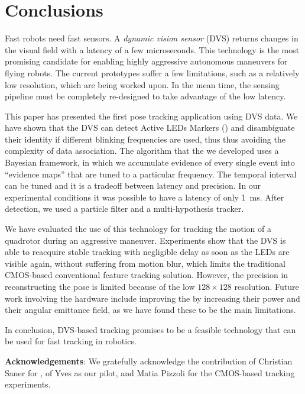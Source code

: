 
\section{Conclusions\label{sec:conclusion}}

Fast robots need fast sensors. A \emph{dynamic vision sensor} (DVS)
returns changes in the visual field with a latency of a few microseconds.
This technology is the most promising candidate for enabling highly
aggressive autonomous maneuvers for flying robots. The current prototypes
suffer a few limitations, such as a relatively low resolution, which
are being worked upon. In the mean time, the sensing pipeline must
be completely re-designed to take advantage of the low latency.

This paper has presented the first pose tracking application using
DVS data. We have shown that the DVS can detect Active LEDs Markers
(\ALMs) and disambiguate their identity if different blinking frequencies
are used, thus thus avoiding the complexity of data association. The
algorithm that the we developed uses a Bayesian framework, in which
we accumulate evidence of every single event into ``evidence maps''
that are tuned to a particular frequency. The temporal interval can
be tuned and it is a tradeoff between latency and precision. In our
experimental conditions it was possible to have a latency of only
1~ms. After detection, we used a particle filter and a multi-hypothesis
tracker. 

We have evaluated the use of this technology for tracking the motion
of a quadrotor during an aggressive maneuver. Experiments show that
the DVS is able to reacquire stable tracking with negligible delay
as soon as the LEDs are visible again, without suffering from motion
blur, which limits the traditional CMOS-based conventional feature
tracking solution. However, the precision in reconstructing the pose
is limited because of the low $128\times128$ resolution. Future work
involving the hardware include improving the \ALMs by increasing
their power and their angular emittance field, as we have found these
to be the main limitations.

In conclusion, DVS-based \ALM tracking promises to be a feasible
technology that can be used for fast tracking in robotics.







\textbf{Acknowledgements}: We gratefully acknowledge the contribution
of Christian Saner for \xxx, of Yves \xxx as our pilot, and Matia
Pizzoli for the CMOS-based tracking experiments.
